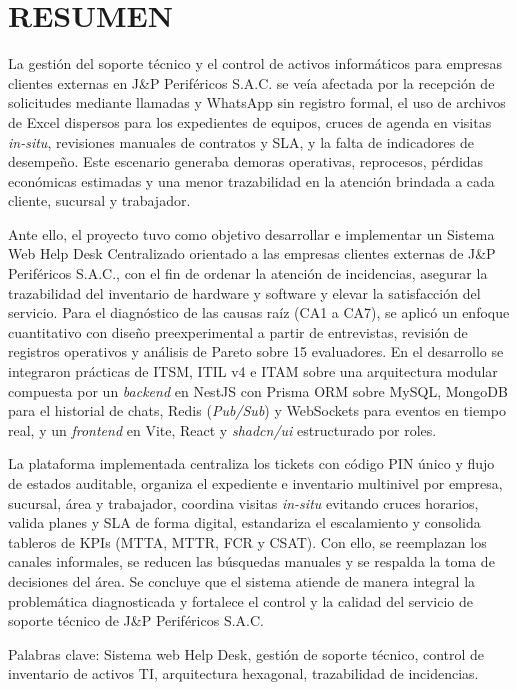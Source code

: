 \chapter*{RESUMEN}

La gestión del soporte técnico y el control de activos informáticos para empresas clientes externas en J\&P Periféricos S.A.C. se veía afectada por la recepción de solicitudes mediante llamadas y WhatsApp sin registro formal, el uso de archivos de Excel dispersos para los expedientes de equipos, cruces de agenda en visitas \textit{in-situ}, revisiones manuales de contratos y SLA, y la falta de indicadores de desempeño. Este escenario generaba demoras operativas, reprocesos, pérdidas económicas estimadas y una menor trazabilidad en la atención brindada a cada cliente, sucursal y trabajador.

Ante ello, el proyecto tuvo como objetivo desarrollar e implementar un Sistema Web Help Desk Centralizado orientado a las empresas clientes externas de J\&P Periféricos S.A.C., con el fin de ordenar la atención de incidencias, asegurar la trazabilidad del inventario de hardware y software y elevar la satisfacción del servicio. Para el diagnóstico de las causas raíz (CA1 a CA7), se aplicó un enfoque cuantitativo con diseño preexperimental a partir de entrevistas, revisión de registros operativos y análisis de Pareto sobre 15 evaluadores. En el desarrollo se integraron prácticas de ITSM, ITIL v4 e ITAM sobre una arquitectura modular compuesta por un \textit{backend} en NestJS con Prisma ORM sobre MySQL, MongoDB para el historial de chats, Redis (\textit{Pub/Sub}) y WebSockets para eventos en tiempo real, y un \textit{frontend} en Vite, React y \textit{shadcn/ui} estructurado por roles.

La plataforma implementada centraliza los tickets con código PIN único y flujo de estados auditable, organiza el expediente e inventario multinivel por empresa, sucursal, área y trabajador, coordina visitas \textit{in-situ} evitando cruces horarios, valida planes y SLA de forma digital, estandariza el escalamiento y consolida tableros de KPIs (MTTA, MTTR, FCR y CSAT). Con ello, se reemplazan los canales informales, se reducen las búsquedas manuales y se respalda la toma de decisiones del área. Se concluye que el sistema atiende de manera integral la problemática diagnosticada y fortalece el control y la calidad del servicio de soporte técnico de J\&P Periféricos S.A.C.

Palabras clave: Sistema web Help Desk, gestión de soporte técnico, control de inventario de activos TI, arquitectura hexagonal, trazabilidad de incidencias.